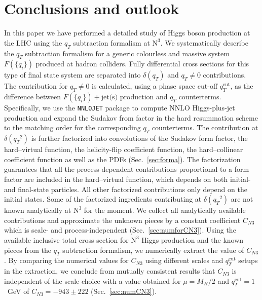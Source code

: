 \documentclass[12pt]{article}
\DeclareRobustCommand{\qt}{\ensuremath{q_T}\xspace}
\DeclareRobustCommand{\qtcut}{\ensuremath{q_T^\mathrm{cut}}\xspace}
\DeclareRobustCommand{\jets}{\text{jet(s)}\xspace}
\DeclareRobustCommand{\LO}{\text{LO}\xspace}
\DeclareRobustCommand{\N}[1]{\ensuremath{\text{N}^{#1}}} %
\begin{document}
\section{Conclusions and outlook}
\label{Sec:conclu}

In this paper we have performed a detailed study of Higgs boson production at the LHC using the $\qt$ subtraction formalism at \N3\LO. We systematically describe the $\qt$ subtraction formalism for a generic colourless and massive system $F(\{q_i\})$ produced at hadron colliders. Fully differential cross sections for this type of final state system are separated into $\delta(\qt)$ and $\qt\ne 0$ contributions. The contribution for $\qt\ne 0$ is calculated, 
using a phase space cut-off $\qtcut$, as the difference between $F(\{q_i\})+\jets$ production and $\qt$ counterterms. Specifically, we use the \texttt{NNLOJET} package to compute NNLO Higgs-plus-jet production and expand the Sudakov from factor in the hard resummation scheme to the matching order for the corresponding $\qt$ counterterms. The contribution at $\delta(\qt^{2})$ is further factorized into convolutions of the Sudakov form factor, the hard--virtual function, the helicity-flip coefficient function, the hard--collinear coefficient function as well as the PDFs (Sec.~\ref{sec:forma}). The factorization guarantees that all the process-dependent contributions proportional to a form factor are included in the hard--virtual function, which depends on both initial- and final-state particles. All other factorized contributions only depend on the initial states. Some of the factorized ingredients contributing at $\delta(\qt^{2})$ are not known analytically at \N3\LO for the moment. We collect all analytically available contributions and approximate the unknown pieces by a constant coefficient $C_{N3}$ which is scale- and process-independent (Sec.~\ref{sec:numforCN3}). Using the available inclusive total cross section for \N3\LO Higgs production and the known pieces from  the $\qt$ subtraction formalism, we numerically extract the value of $C_{N3}$. By comparing the numerical values for $C_{N3}$ using different scales and $\qtcut$ setups in the extraction, we conclude from mutually consistent results that $C_{N3}$ is independent of the scale choice with a value obtained for $\mu=M_H/2$ and $\qtcut = 1$~GeV of $C_{N3}=-943\pm 222$ (Sec.~\ref{sec:numCN3}).
\end{document}
